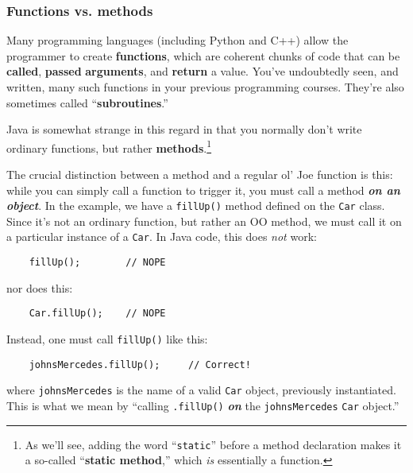 \subsubsection{Functions vs. methods}

Many programming languages (including Python and C++) allow the programmer to
create \textbf{functions}, which are coherent chunks of code that can be
\textbf{called}, \textbf{passed} \textbf{arguments}, and \textbf{return} a
value. You've undoubtedly seen, and written, many such functions in your
previous programming courses. They're also sometimes called
``\textbf{subroutines}.''

Java is somewhat strange in this regard in that you normally don't write
ordinary functions, but rather \textbf{methods}.\footnote{As we'll see, adding
the word ``\texttt{static}'' before a method declaration makes it a so-called
``\textbf{static method},'' which \textit{is} essentially a function.}

The crucial distinction between a method and a regular ol' Joe function is
this: while you can simply call a function to trigger it, you must call a
method \textbf{\textit{on an object}}. In the example, we have a
\texttt{fillUp()} method defined on the \texttt{Car} class. Since it's not an
ordinary function, but rather an OO method, we must call it on a particular
instance of a \texttt{Car}. In Java code, this does \textit{not} work:

\begin{verbatim}
    fillUp();        // NOPE
\end{verbatim}

nor does this:

\begin{verbatim}
    Car.fillUp();    // NOPE
\end{verbatim}

Instead, one must call \texttt{fillUp()} like this:

\begin{verbatim}
    johnsMercedes.fillUp();     // Correct!
\end{verbatim}

where \texttt{johnsMercedes} is the name of a valid \texttt{Car} object,
previously instantiated. This is what we mean by ``calling \texttt{.fillUp()}
\textit{\textbf{on}} the \texttt{johnsMercedes} \texttt{Car} object.''


